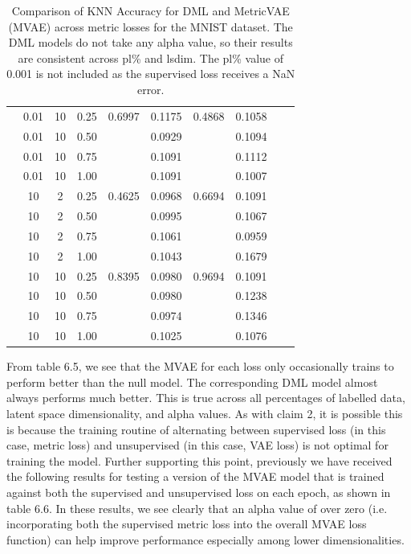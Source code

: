 \documentclass[./dissertation.tex]{subfiles}
\begin{document}
\begin{table}
\begin{tabular}{|c|c|c|c|c|c|c|c|c|c|}
             & 0.01 & 10 & 0.25 & 0.6997 & 0.1175 & 0.4868 & 0.1058 & & \\
             & 0.01 & 10 & 0.50 & & 0.0929 & & 0.1094 & & \\
             & 0.01 & 10 & 0.75 & & 0.1091 & & 0.1112 & & \\
             & 0.01 & 10 & 1.00 & & 0.1091 & & 0.1007 & & \\
             
             & 10 & 2 & 0.25 & 0.4625 & 0.0968 & 0.6694 & 0.1091 & & \\
             & 10 & 2 & 0.50 & & 0.0995 & & 0.1067 & & \\
             & 10 & 2 & 0.75 & & 0.1061 & & 0.0959 & & \\
             & 10 & 2 & 1.00 & & 0.1043 & & 0.1679 & & \\
             
             & 10 & 10 & 0.25 & 0.8395 & 0.0980 & 0.9694 & 0.1091 & & \\
             & 10 & 10 & 0.50 & & 0.0980 & & 0.1238 & & \\
             & 10 & 10 & 0.75 & & 0.0974 & & 0.1346 & & \\
             & 10 & 10 & 1.00 & & 0.1025 & & 0.1076 & & \\
            \hline
       \end{tabular}
       \caption{Comparison of KNN Accuracy for DML and MetricVAE (MVAE) across metric losses for the MNIST dataset. The DML models do not take any alpha value, so their results are consistent across pl\% and lsdim. The pl\% value of 0.001 is not included as the supervised loss receives a NaN error. }
       \label{tab:my_label}
    \end{table}
    
    From table 6.5, we see that the MVAE for each loss only occasionally trains to perform better than the null model. The corresponding DML model almost always performs much better. This is true across all percentages of labelled data, latent space dimensionality, and alpha values. As with claim 2, it is possible this is because the training routine of alternating between supervised loss (in this case, metric loss) and unsupervised (in this case, VAE loss) is not optimal for training the model. Further supporting this point, previously we have received the following results for testing a version of the MVAE model that is trained against both the supervised and unsupervised loss on each epoch, as shown in table 6.6. In these results, we see clearly that an alpha value of over zero (i.e. incorporating both the supervised metric loss into the overall MVAE loss function) can help improve performance especially among lower dimensionalities. 
    
\end{document}
